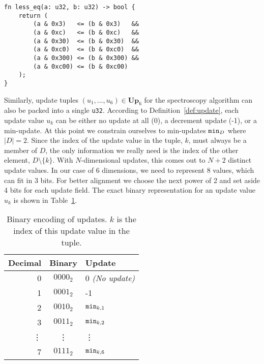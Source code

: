 \begin{lstlisting}[language=WGSL,float,
    caption={WGSL Shader Code handling bit-packed energies
        to calculate if $a \leq b$.
        This is only for the case of 6 elements with a maximum value of 3,
        other configurations will produce different shader code.
        The bitwise AND operation \texttt{a\;\&\;0x3} sets all but the 2
        least significant bits to 0,
        thus comparing just the first field.
        This is repeated with all six fields,
        where each bit mask is written in hexadecimal format.
        For example, hexadecimal C0$_{16}$ is $\ldots0\,1100\,0000_2$ in
        binary, selecting the fourth 2-bit field.
    },
    label=lst:less_eq]
fn less_eq(a: u32, b: u32) -> bool {
    return (
        (a & 0x3)   <= (b & 0x3)   &&
        (a & 0xc)   <= (b & 0xc)   &&
        (a & 0x30)  <= (b & 0x30)  &&
        (a & 0xc0)  <= (b & 0xc0)  &&
        (a & 0x300) <= (b & 0x300) &&
        (a & 0xc00) <= (b & 0xc00)
    );
}
\end{lstlisting}

Similarly, update tuples $(u_1, \ldots, u_6) \in \mathbf{Up}_6$
for the spectroscopy algorithm can also be packed into a single \texttt{u32}.
According to Definition~\ref{def:update}, each update value $u_k$ can be either
no update at all (0),
a decrement update (-1),
or a min-update.
At this point we constrain ourselves to min-updates $\mathtt{min}_D$
where $|D| = 2$.
Since the index of the update value in the tuple, $k$, must always be a member of $D$,
the only information we really need is the index of the other element, $D \setminus \{k\}$.
With $N$-dimensional updates, this comes out to $N + 2$ distinct update values.
In our case of 6 dimensions, we need to represent 8 values,
which can fit in 3 bits.
For better alignment we choose the next power
of 2 and set aside 4 bits for each update field.
The exact binary representation for an update value $u_k$ is shown in
Table~\ref{tab:update_encoding}.

\begin{table}[ht]
\centering
\caption{Binary encoding of updates. $k$ is the index of this update value in
the tuple.}\label{tab:update_encoding}
\begin{tabular}{ r c l }
    \toprule
    Decimal & Binary & Update \\
    \midrule
    0 & $0000_2$ & 0 \emph{(No update)} \\
    1 & $0001_2$ & -1 \\
    2 & $0010_2$ & $\mathtt{min}_{k, 1}$ \\
    3 & $0011_2$ & $\mathtt{min}_{k, 2}$ \\
    \vdots & \vdots & \vdots \\
    7 & $0111_2$ & $\mathtt{min}_{k, 6}$ \\
    \bottomrule
\end{tabular}
\end{table}

